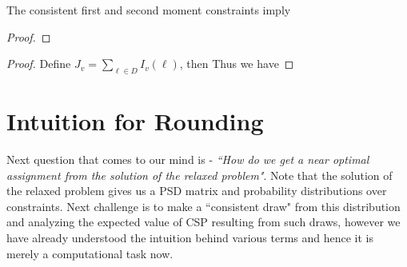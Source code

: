 \documentclass[12pt]{article}
\begin{document}
\begin{remark}
The consistent first and second moment constraints imply 
\end{remark}
\begin{proof}
\end{proof}
\begin{remark}
\end{remark}
\begin{proof}
Define $J_v = \sum_{\ell \in D} I_v(\ell)$, then 
Thus we have 
\end{proof}

\section{Intuition for Rounding}
Next question that comes to our mind is - 
\textit{``How do we get a near optimal assignment from the solution of the relaxed problem"}. 
Note that the solution of the relaxed problem gives us a PSD matrix and probability distributions over constraints. 
Next challenge is to make a ``consistent draw" from this distribution and analyzing the expected value of CSP resulting from such draws, 
however we have already understood the intuition behind various terms and hence it is merely a computational task now.  
\end{document}
